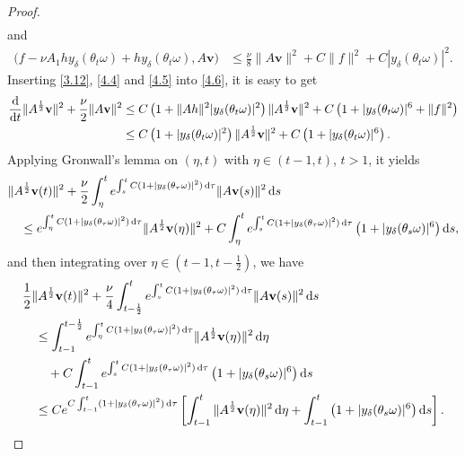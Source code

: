 \documentclass{elsarticle}
\theoremstyle{definition}
\numberwithin{equation}{section}
\renewcommand{\d}{{\rm{d}}}
\begin{document}
\begin{proof}
\begin{align}
\end{align}
and
\begin{align}
\big (f-\nu A_1hy_{\delta}(\theta_t\omega) +hy_{\delta}(\theta_t\omega),A\textbf{v} \big)
& \leq \frac  \nu 8 \|A\textbf{v}\|^2+C\|f\|^2+ C  |y_{\delta}(\theta_t\omega)|^2   .\label{4.5}
\end{align}
Inserting \eqref{3.12}, \eqref{4.4} and \eqref{4.5} into \eqref{4.6}, it is easy to get
\begin{align}\label{4.27}
\frac{\d}{\d t}\|A^{\frac12}\textbf{v}\|^2 +  \frac{\nu }{2} \|A\textbf{v}\|^2
&\leq  C\left ( 1 + \|Ah\|^2|y_{\delta}(\theta_t\omega)|^2 \right)\|A^{\frac12}\textbf{v}\|^2  +
C \left(1 +|y_{\delta}(\theta_t\omega)|^6+\|f\|^2 \right)\nonumber \\
&\leq  C\left ( 1 +  |y_{\delta}(\theta_t\omega)|^2 \right)  \|A^{\frac12}\textbf{v}\|^2  +
C \left(1 +|y_{\delta}(\theta_t\omega)|^6  \right).
\end{align}
Applying Gronwall's lemma on $(\eta, t)$ with $\eta\in  (t-1,t )$, $t >1$, it yields
\begin{align*}
&\|A^{\frac12}\textbf{v}(t)\|^2
+ \frac\nu 2 \int_\eta ^te^{ \int_s^tC(1+|y_{\delta}(\theta_\tau\omega)|^2)\, \d \tau}\|A\textbf{v}(s)\|^2 \, \d s \nonumber\\
&\quad \leq e^{ \int_\eta^tC(1+|y_{\delta}(\theta_\tau\omega)|^2)\, \d \tau}\|A^{\frac12}\textbf{v}( \eta)\|^2 +C\int_\eta^te^{ \int_s^t C(1+ |y_{\delta} (\theta_\tau\omega)|^2)\, \d \tau} \left (1 +|y_{\delta}(\theta_s\omega)|^6 \right)\d s,
\end{align*}
and then integrating over $\eta\in (t-1,t-\frac 12) $, we have
\begin{align*}
& \frac12  \|A^{\frac12}\textbf{v}(t )\|^2
+\frac  \nu 4\int_{t-\frac 12 }^t e^{ \int_s^tC(1+|y_{\delta}(\theta_\tau\omega)|^2)\, \d \tau}\|A\textbf{v}(s)\|^2\, \d s \nonumber\\
&\quad \leq \int_{t-1}^{t-\frac 12}  e^{ \int_\eta^tC(1+|y_{\delta}(\theta_\tau\omega)|^2)\, \d \tau} \|A^{\frac12}\textbf{v}( \eta)\|^2 \, \d \eta
 \nonumber\\
&\qquad +C\int_{t-1}^te^{ \int_s^t C(1+ |y_{\delta}(\theta_\tau\omega)|^2)\, \d \tau} \left (1 +|y_{\delta}(\theta_s\omega)|^6 \right) \d s \nonumber\\
&\quad \leq Ce^{   C \int_{ t-1}^t (1+|y_{\delta}(\theta_\tau\omega)|^2) \, \d \tau}  \left[  \int_{t-1}^{t  }  \|A^{\frac12}\textbf{v}( \eta)\|^2 \, \d \eta  + \int_{t-1}^t \left (1 +|y_{\delta}(\theta_s\omega)|^6 \right)\d s\right]  .
\end{align*}

\end{proof}
\end{document}
